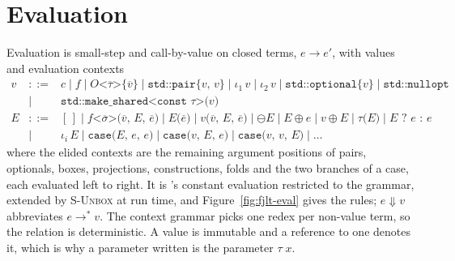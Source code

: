 \section{Evaluation}
\label{app:fjlt:evaluation}

Evaluation is small-step and call-by-value on closed terms, $e \longrightarrow e'$, with values and evaluation contexts
\[
\begin{array}{rcl}
v &::=& c \mid f \mid O\texttt{<}\overline{\tau}\texttt{>\{}\overline{v}\texttt{\}} \mid \texttt{std::pair\{}v\texttt{, }v\texttt{\}} \mid \iota_1\,v \mid \iota_2\,v \mid \texttt{std::optional\{}v\texttt{\}} \mid \texttt{std::nullopt} \\
  &\mid& \texttt{std::make\_shared<const }\tau\texttt{>(}v\texttt{)} \\
E &::=& [\,] \mid f\texttt{<}\overline{\sigma}\texttt{>(}\overline{v}\texttt{, }E\texttt{, }\overline{e}\texttt{)} \mid E\texttt{(}\overline{e}\texttt{)} \mid v\texttt{(}\overline{v}\texttt{, }E\texttt{, }\overline{e}\texttt{)} \mid \ominus E \mid E \oplus e \mid v \oplus E \mid \tau\texttt{(}E\texttt{)} \mid E \texttt{ ? } e \texttt{ : } e \\
  &\mid& \iota_i\,E \mid \texttt{case(}E\texttt{, }e\texttt{, }e\texttt{)} \mid \texttt{case(}v\texttt{, }E\texttt{, }e\texttt{)} \mid \texttt{case(}v\texttt{, }v\texttt{, }E\texttt{)} \mid \ldots
\end{array}
\]
where the elided contexts are the remaining argument positions of pairs, optionals, boxes, projections, constructions, folds and the two branches of a case, each evaluated left to right.
It is \Cpp{}'s constant evaluation restricted to the grammar, extended by \textsc{S-Unbox} at run time, and Figure~\ref{fig:fjlt-eval} gives the rules; $e \Downarrow v$ abbreviates $e \longrightarrow^{*} v$.
The context grammar picks one redex per non-value term, so the relation is deterministic.
A value is immutable and a reference to one denotes it, which is why a parameter written  is the parameter $\tau\; x$.

